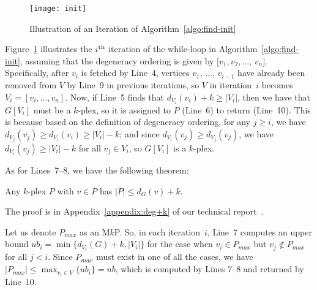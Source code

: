 \documentclass[sigconf, nonacm]{acmart}
\begin{document}
\begin{figure}[t]
\vspace{-3mm}
  \texttt{[image: init]}
  \vspace{-2mm}
  \caption{Illustration of an Iteration of Algorithm~\ref{algo:find-init}}\label{fig:init}
\end{figure}
\setlength{\textfloatsep}{2pt}

Figure~\ref{fig:init} illustrates the $i\textsuperscript{th}$ iteration of the while-loop in Algorithm~\ref{algo:find-init}, assuming that the degeneracy ordering is given by $[v_1, v_2, \ldots$, $v_n]$. Specifically, after $v_i$ is fetched by Line~4, vertices $v_1$, $\ldots$, $v_{i-1}$ have already been removed from $V$ by Line~9 in previous iterations, so $V$ in iteration~$i$ becomes $V_i=[v_i, \ldots, v_n]$. Now, if Line~5 finds that $d_{V_i}(v_i)+k\geq|V_i|$, then we have that $G[V_i]$ must be a $k$-plex, so it is assigned to $P$ (Line~6) to return (Line~10). This is because based on the definition of degeneracy ordering, for any $j\geq i$, we have $d_{V_j}(v_j)\geq d_{V_i}(v_i)\geq |V_i|-k$; and since $d_{V_i}(v_j)\geq d_{V_j}(v_j)$, we have $d_{V_i}(v_j)\geq |V_i|-k$ for all $v_j\in V_i$, so $G[V_i]$ is a $k$-plex.

As for Lines~7--8, we have the following theorem:
\vspace{-1mm}
\begin{theorem}
\label{lemma:deg+k}
    Any $k$-plex $P$ with $v\in P$ has $|P|\leq d_G(v)+k$.
\end{theorem}
The proof is in Appendix~\ref{appendix:deg+k} of our technical report~\cite{tech_report}.
\vspace{1mm}

Let us denote $P_{max}$ as an M$k$P. So, in each iteration~$i$, Line~7 computes an upper bound $ub_i=\min\{d_{V_i}(G)+k, |V_i|\}$ for the case when $v_i\in P_{max}$ but $v_j\notin P_{max}$ for all $j<i$. Since $P_{max}$ must exist in one of all the cases, we have $|P_{max}|\leq \max_{v_i\in V} \{ub_i\}=ub$, which is computed by Lines 7--8 and returned by Line~10.
\end{document}
